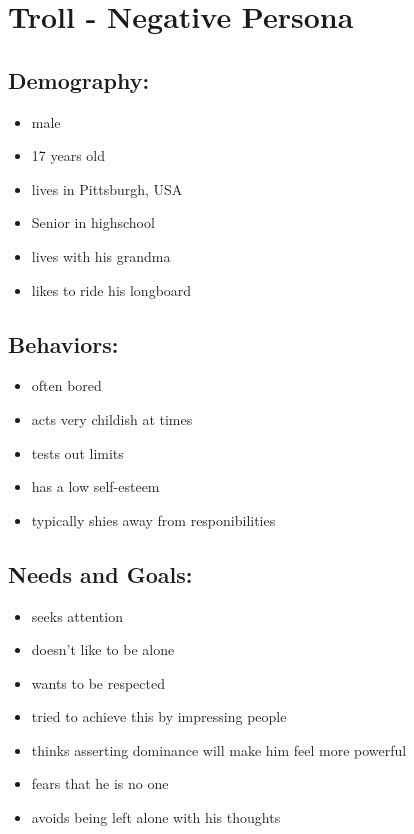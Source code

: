 \documentclass{article}
\date{02.12.2015}
\begin{document}
\section{Troll - Negative Persona}

\subsection{Demography:}
\begin{itemize}
 \item male
 \item 17 years old
 \item lives in Pittsburgh, USA
 \item Senior in highschool
 \item lives with his grandma
 \item likes to ride his longboard
\end{itemize}

\subsection{Behaviors:}
\begin{itemize}
\item often bored
\item acts very childish at times
\item tests out limits
\item has a low self-esteem
\item typically shies away from responibilities
\end{itemize}

\subsection{Needs and Goals:}
\begin{itemize}
 \item seeks attention
 \item doesn't like to be alone
 \item wants to be respected
 \item tried to achieve this by impressing people
 \item thinks asserting dominance will make him feel more powerful
 \item fears that he is no one
 \item avoids being left alone with his thoughts
\end{itemize}

\pagebreak
\end{document}
